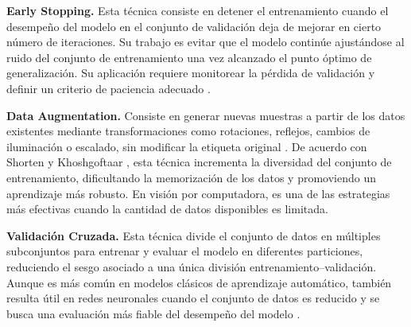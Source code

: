 \begin{flushleft}
		\textbf{Early Stopping.} Esta técnica consiste en detener el entrenamiento cuando el desempeño del modelo en el conjunto de validación deja de mejorar en cierto número de iteraciones. Su trabajo es evitar que el modelo continúe ajustándose al ruido del conjunto de entrenamiento una vez alcanzado el punto óptimo de generalización. Su aplicación requiere monitorear la pérdida de validación y definir un criterio de paciencia adecuado \cite{hinton2012}.
		
		\textbf{Data Augmentation.} Consiste en generar nuevas muestras a partir de los datos existentes mediante transformaciones como rotaciones, reflejos, cambios de iluminación o escalado, sin modificar la etiqueta original \cite{geron2019}. De acuerdo con Shorten y Khoshgoftaar \cite{shorten2019}, esta técnica incrementa la diversidad del conjunto de entrenamiento, dificultando la memorización de los datos y promoviendo un aprendizaje más robusto. En visión por computadora, es una de las estrategias más efectivas cuando la cantidad de datos disponibles es limitada.
		
		\textbf{Validación Cruzada.} Esta técnica divide el conjunto de datos en múltiples subconjuntos para entrenar y evaluar el modelo en diferentes particiones, reduciendo el sesgo asociado a una única división entrenamiento--validación. Aunque es más común en modelos clásicos de aprendizaje automático, también resulta útil en redes neuronales cuando el conjunto de datos es reducido y se busca una evaluación más fiable del desempeño del modelo \cite{hastie2009}.
	\end{flushleft}
	
	
	\small
	\renewcommand{\arraystretch}{1.2}
	
